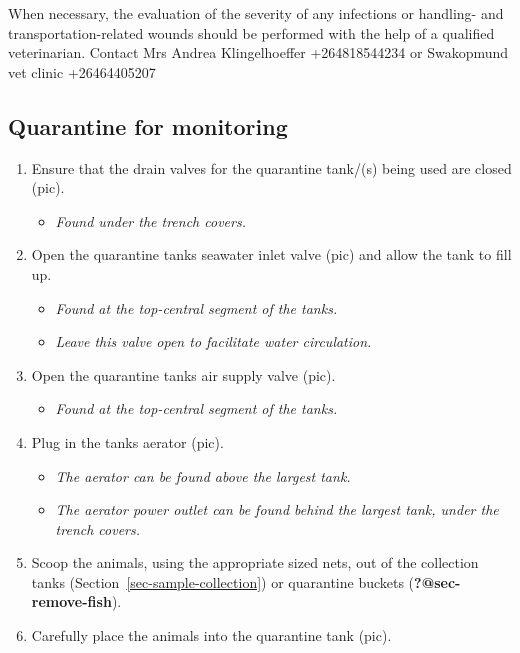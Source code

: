 \documentclass[
  12pt,
]{report}
\providecommand{\tightlist}{%
  \setlength{\itemsep}{0pt}\setlength{\parskip}{0pt}}\usepackage{longtable,booktabs,array}
\begin{document}
{When necessary, the evaluation of the severity of any infections or
handling- and transportation-related wounds should be performed with the
help of a qualified veterinarian. Contact Mrs Andrea Klingelhoeffer
+264818544234 or Swakopmund vet clinic +26464405207}

\hypertarget{sec-qt-monitor}{%
\subsection{Quarantine for monitoring}\label{sec-qt-monitor}}

\begin{enumerate}
\def\labelenumi{\arabic{enumi}.}
\item
  Ensure that the drain valves for the quarantine tank/(s) being used
  are closed (pic).

  \begin{itemize}
  \tightlist
  \item
    \emph{Found under the trench covers.}
  \end{itemize}
\item
  Open the quarantine tanks seawater inlet valve (pic) and allow the
  tank to fill up.

  \begin{itemize}
  \tightlist
  \item
    \emph{Found at the top-central segment of the tanks.}
  \item
    \emph{Leave this valve open to facilitate water circulation.}
  \end{itemize}
\item
  Open the quarantine tanks air supply valve (pic).

  \begin{itemize}
  \tightlist
  \item
    \emph{Found at the top-central segment of the tanks.}
  \end{itemize}
\item
  Plug in the tanks aerator (pic).

  \begin{itemize}
  \tightlist
  \item
    \emph{The aerator can be found above the largest tank.}
  \item
    \emph{The aerator power outlet can be found behind the largest tank,
    under the trench covers.}
  \end{itemize}
\item
  Scoop the animals, using the appropriate sized nets, out of the
  collection tanks (Section~\ref{sec-sample-collection}) or quarantine
  buckets (\textbf{?@sec-remove-fish}).
\item
  Carefully place the animals into the quarantine tank (pic).


\end{enumerate}
\end{document}
